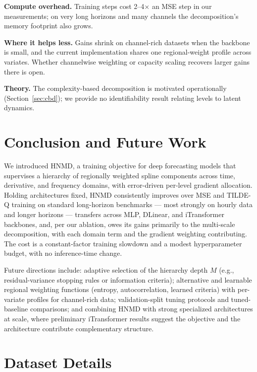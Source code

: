 \documentclass[11pt,twocolumn]{article}
\newcommand{\methodName}{HNMD\xspace}
\begin{document}
\textbf{Compute overhead.} Training steps cost 2--4$\times$ an MSE step in our measurements; on very long horizons and many channels the decomposition's memory footprint also grows.

\textbf{Where it helps less.} Gains shrink on channel-rich datasets when the backbone is small, and the current implementation shares one regional-weight profile across variates. Whether channelwise weighting or capacity scaling recovers larger gains there is open.

\textbf{Theory.} The complexity-based decomposition is motivated operationally (Section~\ref{sec:cbd}); we provide no identifiability result relating levels to latent dynamics.

\section{Conclusion and Future Work}
\label{sec:conclusion}

We introduced \methodName, a training objective for deep forecasting models that supervises a hierarchy of regionally weighted spline components across time, derivative, and frequency domains, with error-driven per-level gradient allocation. Holding architectures fixed, \methodName consistently improves over MSE and TILDE-Q training on standard long-horizon benchmarks --- most strongly on hourly data and longer horizons --- transfers across MLP, DLinear, and iTransformer backbones, and, per our ablation, owes its gains primarily to the multi-scale decomposition, with each domain term and the gradient weighting contributing. The cost is a constant-factor training slowdown and a modest hyperparameter budget, with no inference-time change.

Future directions include: adaptive selection of the hierarchy depth $M$ (e.g., residual-variance stopping rules or information criteria); alternative and learnable regional weighting functions (entropy, autocorrelation, learned criteria) with per-variate profiles for channel-rich data; validation-split tuning protocols and tuned-baseline comparisons; and combining \methodName with strong specialized architectures at scale, where preliminary iTransformer results suggest the objective and the architecture contribute complementary structure.

\FloatBarrier




\clearpage
\appendix

\section{Dataset Details}
\label{app:datasets}
\end{document}
